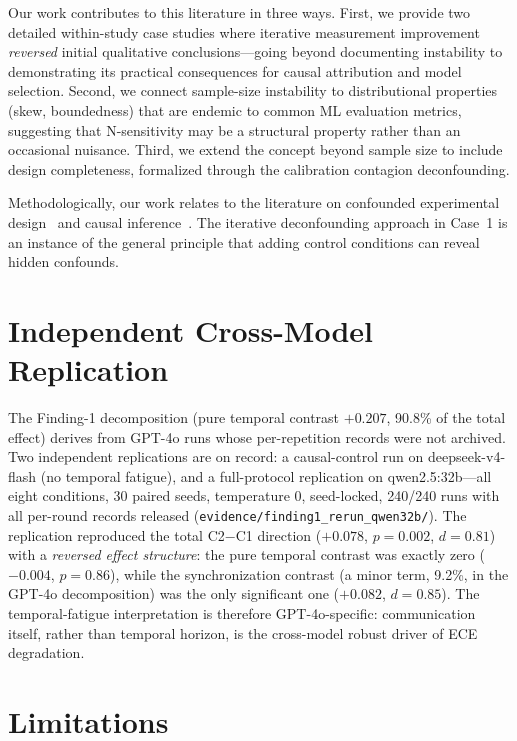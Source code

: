 \documentclass[11pt]{article}
\begin{document}
Our work contributes to this literature in three ways. First, we provide two detailed within-study case studies where iterative measurement improvement \emph{reversed} initial qualitative conclusions---going beyond documenting instability to demonstrating its practical consequences for causal attribution and model selection. Second, we connect sample-size instability to distributional properties (skew, boundedness) that are endemic to common ML evaluation metrics, suggesting that N-sensitivity may be a structural property rather than an occasional nuisance. Third, we extend the concept beyond sample size to include design completeness, formalized through the calibration contagion deconfounding.

Methodologically, our work relates to the literature on confounded experimental design~\cite{shadish2002experimental} and causal inference~\cite{pearl2016causal}. The iterative deconfounding approach in Case~1 is an instance of the general principle that adding control conditions can reveal hidden confounds.

\section{Independent Cross-Model Replication}
The Finding-1 decomposition (pure temporal contrast $+0.207$, 90.8\% of the total effect) derives from GPT-4o runs whose per-repetition records were not archived. Two independent replications are on record: a causal-control run on deepseek-v4-flash (no temporal fatigue), and a full-protocol replication on qwen2.5:32b---all eight conditions, 30 paired seeds, temperature 0, seed-locked, 240/240 runs with all per-round records released (\texttt{evidence/finding1\_rerun\_qwen32b/}). The replication reproduced the total C2$-$C1 direction ($+0.078$, $p = 0.002$, $d = 0.81$) with a \emph{reversed effect structure}: the pure temporal contrast was exactly zero ($-0.004$, $p = 0.86$), while the synchronization contrast (a minor term, 9.2\%, in the GPT-4o decomposition) was the only significant one ($+0.082$, $d = 0.85$). The temporal-fatigue interpretation is therefore GPT-4o-specific: communication itself, rather than temporal horizon, is the cross-model robust driver of ECE degradation.

\section{Limitations}
\end{document}
